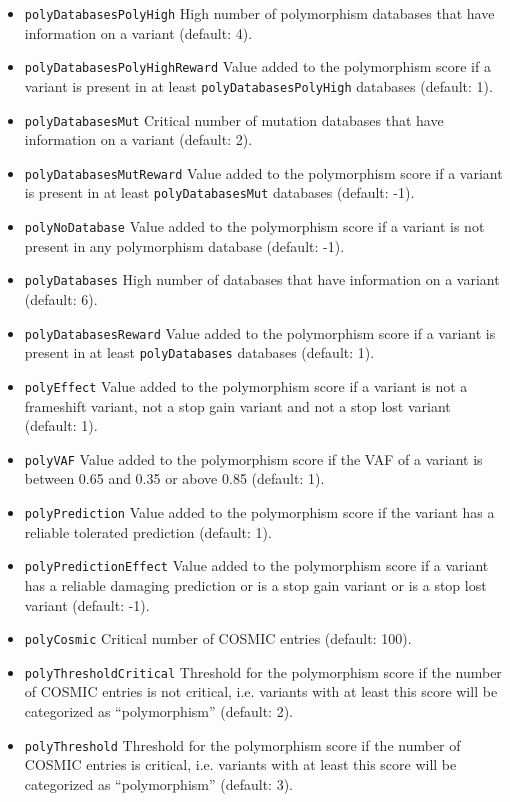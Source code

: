 \documentclass{article}
\begin{document}
\begin{itemize}
  \item \texttt{polyDatabasesPolyHigh} High number of polymorphism databases that have information on a variant (default: 4).
  \item \texttt{polyDatabasesPolyHighReward} Value added to the polymorphism score if a variant is present in at least \texttt{polyDatabasesPolyHigh} databases (default: 1).
  \item \texttt{polyDatabasesMut} Critical number of mutation databases that have information on a variant (default: 2).
  \item \texttt{polyDatabasesMutReward} Value added to the polymorphism score if a variant is present in at least \texttt{polyDatabasesMut} databases (default: -1).
  \item \texttt{polyNoDatabase} Value added to the polymorphism score if a variant is not present in any polymorphism database (default: -1).
  \item \texttt{polyDatabases} High number of databases that have information on a variant (default: 6).
  \item \texttt{polyDatabasesReward} Value added to the polymorphism score if a variant is present in at least \texttt{polyDatabases} databases (default: 1).
  \item \texttt{polyEffect} Value added to the polymorphism score if a variant is not a frameshift variant, not a stop gain variant and not a stop lost variant (default: 1).
  \item \texttt{polyVAF} Value added to the polymorphism score if the VAF of a variant is between 0.65 and 0.35 or above 0.85 (default: 1).
  \item \texttt{polyPrediction} Value added to the polymorphism score if the variant has a reliable tolerated prediction (default: 1).
  \item \texttt{polyPredictionEffect} Value added to the polymorphism score if a variant has a reliable damaging prediction or is a stop gain variant or is a stop lost variant (default: -1).
  \item \texttt{polyCosmic} Critical number of COSMIC entries (default: 100).
  \item \texttt{polyThresholdCritical} Threshold for the polymorphism score if the number of COSMIC entries is not critical, i.e. variants with at least this score will be categorized as ``polymorphism'' (default: 2).
  \item \texttt{polyThreshold} Threshold for the polymorphism score if the number of COSMIC entries is critical, i.e. variants with at least this score will be categorized as ``polymorphism'' (default: 3).

\end{itemize}
\end{document}
